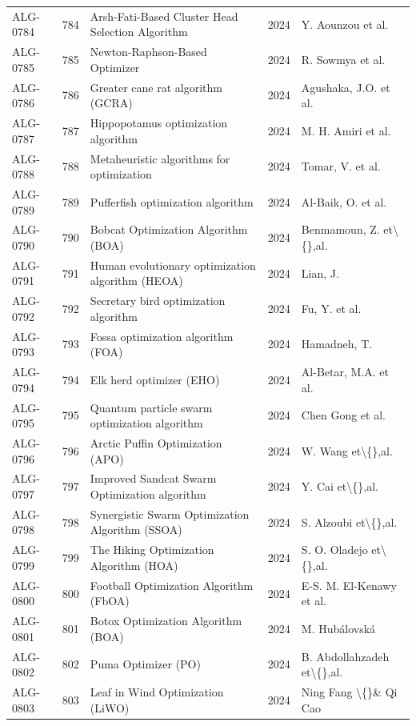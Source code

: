 \documentclass[8pt]{article}
\begin{document}
\begin{landscape}
\begin{longtable}{P{1.7cm}rP{10.0cm}rP{7.2cm}}
ALG-0784 & 784 & Arsh-Fati-Based Cluster Head Selection Algorithm & 2024 & Y. Aounzou et al. \\
ALG-0785 & 785 & Newton-Raphson-Based Optimizer & 2024 & R. Sowmya et al. \\
ALG-0786 & 786 & Greater cane rat algorithm (GCRA) & 2024 & Agushaka, J.O. et al. \\
ALG-0787 & 787 & Hippopotamus optimization algorithm & 2024 & M. H. Amiri et al. \\
ALG-0788 & 788 & Metaheuristic algorithms for optimization & 2024 & Tomar, V. et al. \\
ALG-0789 & 789 & Pufferfish optimization algorithm & 2024 & Al-Baik, O. et al. \\
ALG-0790 & 790 & Bobcat Optimization Algorithm (BOA) & 2024 & Benmamoun, Z. et\textbackslash\{\},al. \\
ALG-0791 & 791 & Human evolutionary optimization algorithm (HEOA) & 2024 & Lian, J. \\
ALG-0792 & 792 & Secretary bird optimization algorithm & 2024 & Fu, Y. et al. \\
ALG-0793 & 793 & Fossa optimization algorithm (FOA) & 2024 & Hamadneh, T. \\
ALG-0794 & 794 & Elk herd optimizer (EHO) & 2024 & Al-Betar, M.A. et al. \\
ALG-0795 & 795 & Quantum particle swarm optimization algorithm & 2024 & Chen Gong et al. \\
ALG-0796 & 796 & Arctic Puffin Optimization (APO) & 2024 & W. Wang et\textbackslash\{\},al. \\
ALG-0797 & 797 & Improved Sandcat Swarm Optimization algorithm & 2024 & Y. Cai et\textbackslash\{\},al. \\
ALG-0798 & 798 & Synergistic Swarm Optimization Algorithm (SSOA) & 2024 & S. Alzoubi et\textbackslash\{\},al. \\
ALG-0799 & 799 & The Hiking Optimization Algorithm (HOA) & 2024 & S. O. Oladejo et\textbackslash\{\},al. \\
ALG-0800 & 800 & Football Optimization Algorithm (FbOA) & 2024 & E-S. M. El-Kenawy et al. \\
ALG-0801 & 801 & Botox Optimization Algorithm (BOA) & 2024 & M. Hubálovská \\
ALG-0802 & 802 & Puma Optimizer (PO) & 2024 & B. Abdollahzadeh et\textbackslash\{\},al. \\
ALG-0803 & 803 & Leaf in Wind Optimization (LiWO) & 2024 & Ning Fang \textbackslash\{\}\& Qi Cao \\

\end{longtable}
\end{landscape}
\end{document}
